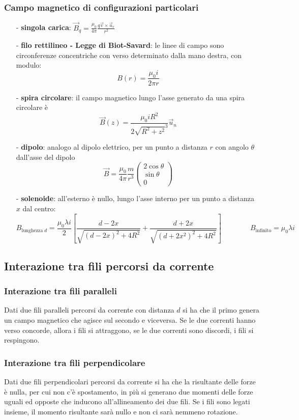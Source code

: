 \documentclass[a4paper]{article}
\newcommand\ur{\vec{u}_r}
\newcommand\un{\vec{u}_n}
\begin{document}
\subsubsection*{Campo magnetico di configurazioni particolari}
\begin{itemize}[topsep=3pt, itemsep=0pt]
	\item[-] \textbf{singola carica}: \(\displaystyle \vec{B}_q = \frac{\mu_0}{4 \pi} \frac{q \vec{v} \times \ur}{r^2}\)
	\item[-] \textbf{filo rettilineo - Legge di Biot-Savard}: le linee di campo sono circonferenze concentriche con verso
	determinato dalla mano destra, con modulo: \[B(r) = \frac{\mu_0 i}{2 \pi r}\]
	\item[-] \textbf{spira circolare}: il campo magnetico lungo l'asse generato da una spira circolare è
	\[\vec{B}(z) = \frac{\mu_0 i R^2}{2 \sqrt{R^2 + z^2}^3} \un\]
	\item[-] \textbf{dipolo}: analogo al dipolo elettrico, per un punto a distanza \(r\) con angolo \(\theta\)
	dall'asse del dipolo
	\[\vec{B} = \frac{\mu_0}{4 \pi} \frac{m}{r^3} \left(\begin{matrix} 2 \cos \theta \\ \sin \theta \\ 0 \end{matrix}\right)\]
	\item[-] \textbf{solenoide}: all'esterno è nullo, lungo l'asse interno per un punto a distanza \(x\) dal centro:
	\[B_{\text{lunghezza} \; d} = \frac{\mu_0 \lambda i}{2} \left[ \frac{d-2x}{\sqrt{(d-2x)^2+4R^2}} + \frac{d+2x}{\sqrt{(d+2x^2)^2 + 4R^2}} \right]\qquad \qquad B_\text{infinito} = \mu_0 \lambda i\]
\end{itemize}

\newpage

\subsection{Interazione tra fili percorsi da corrente}
\subsubsection*{Interazione tra fili paralleli}
Dati due fili paralleli percorsi da corrente con distanza \(d\) si ha che il primo genera un campo magnetico che agisce sul
secondo e viceversa. Se le due correnti hanno verso concorde, allora i fili si attraggono, se le due correnti sono discordi,
i fili si respingono.

\subsubsection*{Interazione tra fili perpendicolare}
Dati due fili perpendicolari percorsi da corrente si ha che la risultante delle forze è nulla, per cui non c'è spostamento,
in più si generano due momenti delle forze uguali ed opposte che inducono all'allineamento dei due fili. Se i fili sono legati
insieme, il momento risultante sarà nullo e non ci sarà nemmeno rotazione.
\end{document}

